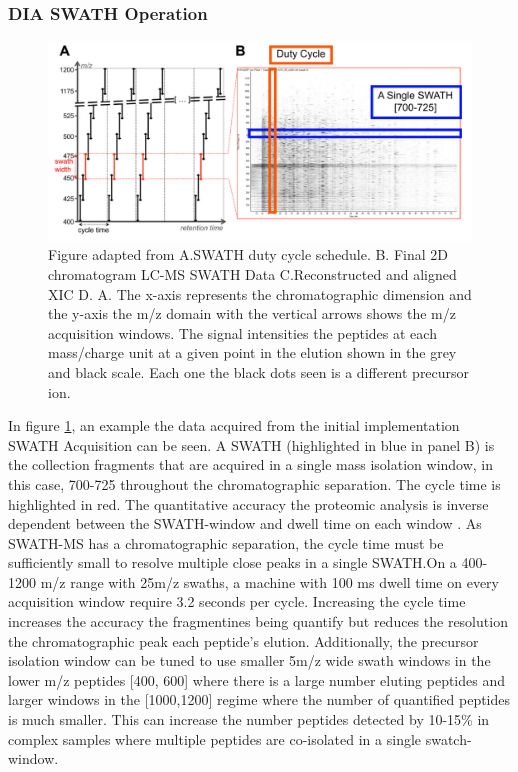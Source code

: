 \documentclass[a4paper,11pt,twoside]{book}
\begin{document}
	\subsubsection{DIA SWATH Operation}
	\begin{figure}[t!]
		\centering
		\includegraphics[width=1.0\linewidth]{3.Proteomics/DIA_SWATH_Principle_1.pdf}
		\caption{Figure adapted from \citep{Rost2014OpenSWATHData} A.SWATH duty cycle schedule. B. Final 2D chromatogram LC-MS SWATH Data C.Reconstructed and aligned XIC D.  A. The x-axis represents the chromatographic dimension and the y-axis the m/z domain with the vertical arrows shows the m/z acquisition windows. The signal intensities the peptides at each mass/charge unit at a given point in the elution shown in the grey and black scale. Each one the black dots seen is  a different precursor ion.}
		\label{Deconvoluted MS2 Spectra}
	\end{figure}
	
    In figure \ref{Deconvoluted MS2 Spectra}, an example the data acquired from the initial implementation SWATH Acquisition can be seen. A SWATH (highlighted in blue in panel B) is the collection fragments that are acquired in a single mass isolation window, in this case, 700-725 throughout the chromatographic separation. The cycle time is highlighted in red. The quantitative accuracy the proteomic analysis is inverse dependent between the SWATH-window and dwell time on each window \citep{rost2017automated}. As SWATH-MS has a chromatographic separation, the cycle time must be sufficiently small to resolve multiple close peaks in a single SWATH.On a 400-1200 m/z range with 25m/z swaths, a machine with 100 ms dwell time on every acquisition window require 3.2 seconds per cycle. Increasing the cycle time increases the accuracy the fragmentines being quantify but reduces the resolution the chromatographic peak each peptide's elution\citep{Lange2008SelectedTutorial.}. Additionally, the precursor isolation window can be tuned to use smaller 5m/z wide swath windows in the lower m/z peptides [400, 600] where there is a large number eluting peptides and larger windows in the [1000,1200] regime where the number of quantified peptides is much smaller. This can increase the number peptides detected by 10-15\% in complex samples where multiple peptides are co-isolated in a single swatch-window.
	
\end{document}
